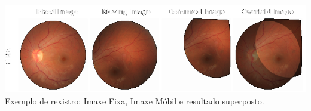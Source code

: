 \documentclass[xcolor=dvipsnames]{beamer}
\begin{document}
\begin{frame}
\begin{columns}
        \begin{column}{0.4\textwidth}
            \centering
            \includegraphics[width=\textwidth]{../imaxes/retin-reg.png}
            \small Exemplo de rexistro: Imaxe Fixa, Imaxe Móbil e resultado superposto.
        \end{column}
    \end{columns}
    
\end{frame}
\end{document}
